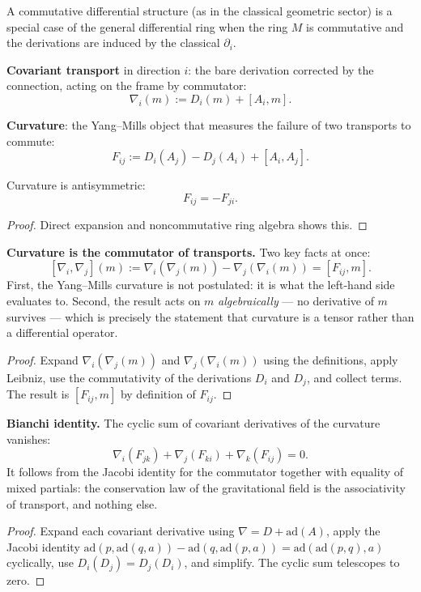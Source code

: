\begin{remark}
A commutative differential structure (as in the classical geometric sector) is a special case of the general differential ring when the ring $M$ is commutative and the derivations are induced by the classical $\partial_i$.
\end{remark}

\begin{definition}
\textbf{Covariant transport} in direction $i$: the bare derivation corrected by the connection, acting on the frame by commutator:
\[
\nabla_i(m) := D_i(m) + [A_i, m].
\]
\end{definition}

\begin{definition}
\textbf{Curvature}: the Yang–Mills object that measures the failure of two transports to commute:
\[
F_{ij} := D_i(A_j) - D_j(A_i) + [A_i, A_j].
\]
\end{definition}

\begin{theorem}
Curvature is antisymmetric:
\[
F_{ij} = -F_{ji}.
\]
\begin{proof}
Direct expansion and noncommutative ring algebra shows this.
\end{proof}
\end{theorem}

\begin{theorem}
\textbf{Curvature is the commutator of transports.} Two key facts at once:
\[
[\nabla_i, \nabla_j](m) := \nabla_i(\nabla_j(m)) - \nabla_j(\nabla_i(m)) = [F_{ij}, m].
\]
First, the Yang–Mills curvature is not postulated: it is what the left-hand side evaluates to. Second, the result acts on $m$ \emph{algebraically} — no derivative of $m$ survives — which is precisely the statement that curvature is a tensor rather than a differential operator.
\begin{proof}
Expand $\nabla_i(\nabla_j(m))$ and $\nabla_j(\nabla_i(m))$ using the definitions, apply Leibniz, use the commutativity of the derivations $D_i$ and $D_j$, and collect terms. The result is $[F_{ij}, m]$ by definition of $F_{ij}$.
\end{proof}
\end{theorem}

\begin{theorem}
\textbf{Bianchi identity.} The cyclic sum of covariant derivatives of the curvature vanishes:
\[
\nabla_i(F_{jk}) + \nabla_j(F_{ki}) + \nabla_k(F_{ij}) = 0.
\]
It follows from the Jacobi identity for the commutator together with equality of mixed partials: the conservation law of the gravitational field is the associativity of transport, and nothing else.
\begin{proof}
Expand each covariant derivative using $\nabla = D + \text{ad}(A)$, apply the Jacobi identity $\text{ad}(p, \text{ad}(q, a)) - \text{ad}(q, \text{ad}(p, a)) = \text{ad}(\text{ad}(p, q), a)$ cyclically, use $D_i(D_j) = D_j(D_i)$, and simplify. The cyclic sum telescopes to zero.
\end{proof}
\end{theorem}

